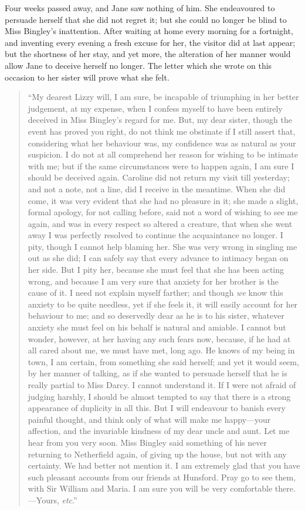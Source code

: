 \documentclass[12pt,english,oneside]{book}
\begin{document}
Four weeks passed away, and Jane saw nothing of him. She endeavoured
to persuade herself that she did not regret it; but she could no longer
be blind to Miss Bingley's inattention. After waiting at home every
morning for a fortnight, and inventing every evening a fresh excuse
for her, the visitor did at last appear; but the shortness of her
stay, and yet more, the alteration of her manner would allow Jane
to deceive herself no longer. The letter which she wrote on this occasion
to her sister will prove what she felt.

\begin{quote}
{}``My dearest Lizzy will, I am sure, be incapable of triumphing
in her better judgement, at my expense, when I confess myself to have
been entirely deceived in Miss Bingley's regard for me. But, my dear
sister, though the event has proved you right, do not think me obstinate
if I still assert that, considering what her behaviour was, my confidence
was as natural as your suspicion. I do not at all comprehend her reason
for wishing to be intimate with me; but if the same circumstances
were to happen again, I am sure I should be deceived again. Caroline
did not return my visit till yesterday; and not a note, not a line,
did I receive in the meantime. When she did come, it was very evident
that she had no pleasure in it; she made a slight, formal apology,
for not calling before, said not a word of wishing to see me again,
and was in every respect so altered a creature, that when she went
away I was perfectly resolved to continue the acquaintance no longer.
I pity, though I cannot help blaming her. She was very wrong in singling
me out as she did; I can safely say that every advance to intimacy
began on her side. But I pity her, because she must feel that she
has been acting wrong, and because I am very sure that anxiety for
her brother is the cause of it. I need not explain myself farther;
and though \textit{we} know this anxiety to be quite needless, yet
if she feels it, it will easily account for her behaviour to me; and
so deservedly dear as he is to his sister, whatever anxiety she must
feel on his behalf is natural and amiable. I cannot but wonder, however,
at her having any such fears now, because, if he had at all cared
about me, we must have met, long ago. He knows of my being in town,
I am certain, from something she said herself; and yet it would seem,
by her manner of talking, as if she wanted to persuade herself that
he is really partial to Miss Darcy. I cannot understand it. If I were
not afraid of judging harshly, I should be almost tempted to say that
there is a strong appearance of duplicity in all this. But I will
endeavour to banish every painful thought, and think only of what
will make me happy\mbox{---}your affection, and the invariable kindness
of my dear uncle and aunt. Let me hear from you very soon. Miss Bingley
said something of his never returning to Netherfield again, of giving
up the house, but not with any certainty. We had better not mention
it. I am extremely glad that you have such pleasant accounts from
our friends at Hunsford. Pray go to see them, with Sir William and
Maria. I am sure you will be very comfortable there.\mbox{---}Yours,
\textit{etc}.'' 
\end{quote}
\end{document}
